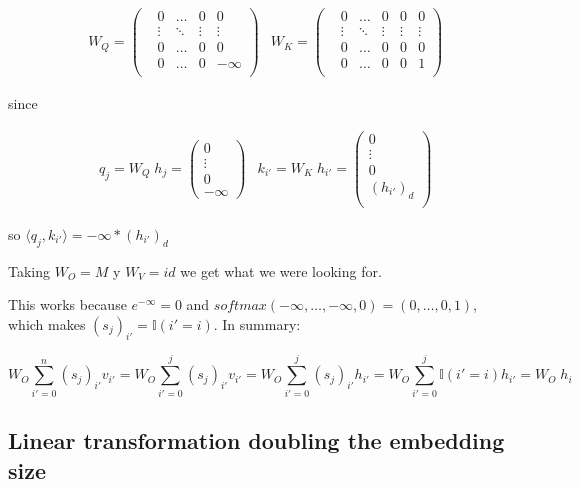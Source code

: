 \begin{align*}
    & W_Q = \left(\begin{matrix}
    &0      &\hdots &0      &0          \\
    &\vdots &\ddots &\vdots &\vdots     \\
    &0      &\hdots &0      &0          \\
    &0      &\hdots &0      &-\infty    \\
\end{matrix}\right)
    &W_K = \left(\begin{matrix}
    &0      &\hdots &0      &0      &0      \\
    &\vdots &\ddots &\vdots &\vdots &\vdots \\
    &0      &\hdots &0      &0      &0      \\
    &0      &\hdots &0      &0      &1      \\
\end{matrix}\right)
\end{align*}


since


\begin{align*}
    &q_{j} = W_Q \; h_j = \left(\begin{matrix}
        0 \\
        \vdots \\
        0 \\
        -\infty
    \end{matrix}\right)
    &k_{i'} = W_K \; h_{i'} = \left(\begin{matrix}
        0 \\
        \vdots \\
        0 \\
        (h_{i'})_{d} \\
    \end{matrix}\right)
\end{align*}

so $\langle q_{j}, k_{i'} \rangle = -\infty *(h_{i'})_{d}$

\bigskip

Taking $W_O = M$ y $W_V = id$ we get what we were looking for. 

This works because $e^{-\infty} = 0$ and $softmax(-\infty, \dots, -\infty, 0) = (0, \dots, 0, 1)$, which makes $(s_j)_{i'} = \mathbb{I}(i' = i)$. In summary:

\[
  W_O \sum_{i'=0}^{n} (s_j)_{i'} v_{i'} = 
  W_O \sum_{i'=0}^{j} (s_j)_{i'} v_{i'} = 
  W_O \sum_{i'=0}^{j} (s_j)_{i'} h_{i'} = 
  W_O \sum_{i'=0}^{j} \mathbb{I}(i' = i) h_{i'} = 
  W_O \; h_i
\]


\subsection*{Linear transformation doubling the embedding size}

